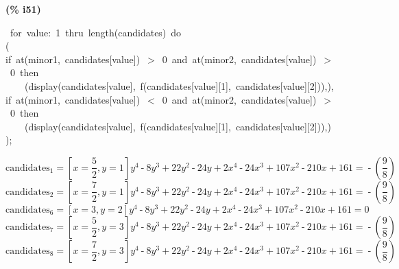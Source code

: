 \documentclass[a4paper, 12pt]{article}
\begin{document}
\begin{minipage}[t]{4.000000em}\color{red}\bfseries
(\% i51)	
\end{minipage}
\begin{minipage}[t]{\textwidth}\color{blue}
\ for\ value:\ 1\ thru\ length(candidates)\ do\ \\
(\\
if\ at(minor1,\ candidates[value])\ \ensuremath{>}\ 0\ and\ at(minor2,\ candidates[value])\ \ensuremath{>}\ 0\ then\\
\ \ \ \ (display(candidates[value],\ f(candidates[value][1],\ candidates[value][2])),),\\
if\ at(minor1,\ candidates[value])\ \ensuremath{<}\ 0\ and\ at(minor2,\ candidates[value])\ \ensuremath{>}\ 0\ then\ \\
\ \ \ \ (display(candidates[value],\ f(candidates[value][1],\ candidates[value][2])),)\\
);
\end{minipage}
\[\displaystyle {{\ensuremath{\mathrm{candidates}}}_1}\operatorname{=}\left[ x\operatorname{=}\frac{5}{2}\operatorname{,}y\operatorname{=}1\right] {{y}^{4}}\operatorname{-}8 {{y}^{3}}\operatorname{+}22 {{y}^{2}}\operatorname{-}24 y\operatorname{+}2 {{x}^{4}}\operatorname{-}24 {{x}^{3}}\operatorname{+}107 {{x}^{2}}\operatorname{-}210 x\operatorname{+
}161\operatorname{=}\operatorname{-}\left( \frac{9}{8}\right) \]
\[{{\ensuremath{\mathrm{candidates}}}_2}\operatorname{=}\left[ x\operatorname{=}\frac{7}{2}\operatorname{,}y\operatorname{=}1\right] {{y}^{4}}\operatorname{-}8 {{y}^{3}}\operatorname{+}22 {{y}^{2}}\operatorname{-}24 y\operatorname{+}2 {{x}^{4}}\operatorname{-}24 {{x}^{3}}\operatorname{+}107 {{x}^{2}}\operatorname{-}210 x\operatorname{+
}161\operatorname{=}\operatorname{-}\left( \frac{9}{8}\right)
\]\[{{\ensuremath{\mathrm{candidates}}}_6}\operatorname{=}\left[ x\operatorname{=}3\operatorname{,}y\operatorname{=}2\right] {{y}^{4}}\operatorname{-}8 {{y}^{3}}\operatorname{+}22 {{y}^{2}}\operatorname{-}24 y\operatorname{+}2 {{x}^{4}}\operatorname{-}24 {{x}^{3}}\operatorname{+}107 {{x}^{2}}\operatorname{-}210 x\operatorname{+
}161\operatorname{=}0
\]\[{{\ensuremath{\mathrm{candidates}}}_7}\operatorname{=}\left[ x\operatorname{=}\frac{5}{2}\operatorname{,}y\operatorname{=}3\right] {{y}^{4}}\operatorname{-}8 {{y}^{3}}\operatorname{+}22 {{y}^{2}}\operatorname{-}24 y\operatorname{+}2 {{x}^{4}}\operatorname{-}24 {{x}^{3}}\operatorname{+}107 {{x}^{2}}\operatorname{-}210 x\operatorname{+
}161\operatorname{=}\operatorname{-}\left( \frac{9}{8}\right) \]\[{{\ensuremath{\mathrm{candidates}}}_8}\operatorname{=}\left[ x\operatorname{=}\frac{7}{2}\operatorname{,}y\operatorname{=}3\right] {{y}^{4}}\operatorname{-}8 {{y}^{3}}\operatorname{+}22 {{y}^{2}}\operatorname{-}24 y\operatorname{+}2 {{x}^{4}}\operatorname{-}24 {{x}^{3}}\operatorname{+}107 {{x}^{2}}\operatorname{-}210 x\operatorname{+
}161\operatorname{=}\operatorname{-}\left( \frac{9}{8}\right) \mbox{}\]
\end{document}
